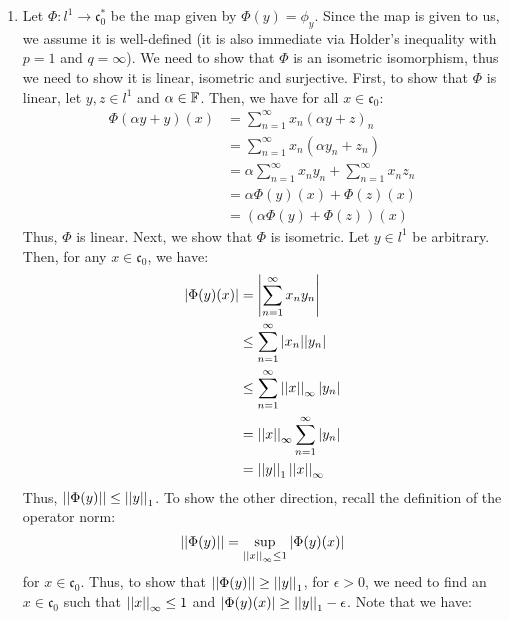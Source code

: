 \documentclass[12pt]{article}
\begin{document}
\begin{solution}
    \bbni
    \begin{enumerate}
        \item Let $\Phi: l^1 \to \mathfrak{c}_0^*$ be the map given by $\Phi(y) = \phi_y$. Since the map is given to us, we assume it is well-defined (it is also immediate via Holder's inequality with $p =1 $ and $q = \infty$). We need to show that $\Phi$ is an isometric isomorphism, thus we need to show it is linear, isometric and surjective. \bbni
        First, to show that $\Phi$ is linear, let $y, z \in l^1$ and $\alpha \in \mathbb F$. Then, we have for all $x \in \mathfrak{c}_0$:
        \begin{align*}
            \Phi(\alpha y + y )(x) &= \sum_{n=1}^\infty x_n(\alpha y + z)_n \\
            &= \sum_{n=1}^\infty x_n(\alpha y_n + z_n) \\
            &= \alpha \sum_{n=1}^\infty x_ny_n + \sum_{n=1}^\infty x_nz_n \\
            &= \alpha \Phi(y)(x) + \Phi(z)(x) \\
            &= (\alpha \Phi(y) + \Phi(z))(x)
        \end{align*}
        Thus, $\Phi$ is linear. Next, we show that $\Phi$ is isometric. Let $y \in l^1$ be arbitrary. Then, for any $x \in \mathfrak{c}_0$, we have:
        \begin{align*}
            |\Phi(y)(x)| &= \left|\sum_{n=1}^\infty x_ny_n\right| \\ 
            &\leq \sum_{n=1}^\infty |x_n||y_n| \\
            & \leq \sum_{n=1}^\infty \left\vert\left\vert x\right\vert\right\vert_\infty |y_n| \\
            & = \left\vert\left\vert x\right\vert\right\vert_\infty \sum_{n=1}^\infty |y_n| \\
            & = \left\vert\left\vert y\right\vert\right\vert_1 \left\vert\left\vert x\right\vert\right\vert_\infty 
        \end{align*}     
        Thus, $\left\vert\left\vert\Phi(y)\right\vert\right\vert \leq \left\vert\left\vert y\right\vert\right\vert_1$. To show the other direction, recall the definition of the operator norm:
        \[ \left\vert\left\vert\Phi(y)\right\vert\right\vert = \sup_{\left\vert\left\vert x\right\vert\right\vert_\infty \leq 1} |\Phi(y)(x)|\]
        for $x \in \mathfrak{c}_0$. Thus, to show that $\left\vert\left\vert\Phi(y)\right\vert\right\vert \geq \left\vert\left\vert y\right\vert\right\vert_1$, for $\epsilon > 0$, we need to find an $x \in \mathfrak{c}_0$ such that $\left\vert\left\vert x\right\vert\right\vert_\infty \leq 1$ and $|\Phi(y)(x)| \geq \left\vert\left\vert y\right\vert\right\vert_1 - \epsilon$. \bbni
        Note that we have:

\end{enumerate}
\end{solution}
\end{document}

